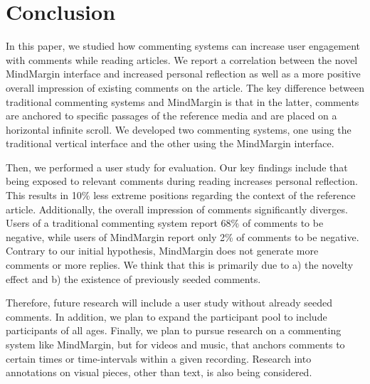 \section{Conclusion}

In this paper, we studied how commenting systems can increase user engagement with comments while reading articles. We report a correlation between the novel MindMargin interface and increased personal reflection as well as a more positive overall impression of existing comments on the article. The key difference between traditional commenting systems and MindMargin is that in the latter, comments are anchored to specific passages of the reference media and are placed on a horizontal infinite scroll. We developed two commenting systems, one using the traditional vertical interface and the other using the MindMargin interface. 

Then, we performed a user study for evaluation. Our key findings include that being exposed to relevant comments during reading increases personal reflection. This results in 10\% less extreme positions regarding the context of the reference article. Additionally, the overall impression of comments significantly diverges. Users of a traditional commenting system report 68\% of comments to be negative, while users of MindMargin report only 2\% of comments to be negative. Contrary to our initial hypothesis, MindMargin does not generate more comments or more replies. We think that this is primarily due to a) the novelty effect and b) the existence of previously seeded comments. 

Therefore, future research will include a user study without already seeded comments. In addition, we plan to expand the participant pool to include participants of all ages. Finally, we plan to pursue research on a commenting system like MindMargin, but for videos and music, that anchors comments to certain times or time-intervals within a given recording. Research into annotations on visual pieces, other than text, is also being considered.
